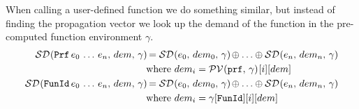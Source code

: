 \documentclass[../main.tex]{subfiles}
\begin{document}
When calling a user-defined function we do something similar, but instead of finding the propagation vector we look up the demand of the function in the pre-computed function environment $\gamma$.
\begin{align*}
    \sd{\texttt{Prf}\, e_0\, \dots\, e_n}{dem}
        &= \sd{e_0}{dem_0} \oplus \dots \oplus \sd{e_n}{dem_n} \\
        &\text{where } dem_i = \pv{\texttt{prf}}[i][dem] \\
    \sd{\texttt{FunId}\, e_0\, \dots\, e_n}{dem}
        &= \sd{e_0}{dem_0} \oplus \dots \oplus \sd{e_n}{dem_n} \\
        &\text{where } dem_i = \gamma[\texttt{FunId}][i][dem]
\end{align*}
\end{document}
